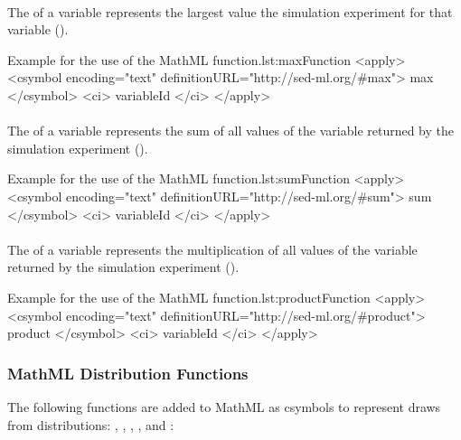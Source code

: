 \paragraph*{}
\label{fun:max}
The  of a variable represents the largest value the simulation experiment for that variable ().
\begin{myXmlLst}{Example for the use of the MathML  function.}{lst:maxFunction}
<apply>
 	<csymbol encoding="text" definitionURL="http://sed-ml.org/#max">
 		max
 	</csymbol>
 	<ci> variableId </ci>
</apply>
\end{myXmlLst}

\paragraph*{}
\label{fun:sum}
The  of a variable represents the sum of all values of the variable returned by the simulation experiment ().
\begin{myXmlLst}{Example for the use of the MathML  function.}{lst:sumFunction}
<apply>
 	<csymbol encoding="text" definitionURL="http://sed-ml.org/#sum">
 		sum
 	</csymbol>
 	<ci> variableId </ci>
</apply>
\end{myXmlLst}

\paragraph*{}
\label{fun:product}
The  of a variable represents the multiplication of all values of the variable returned by the simulation experiment ().
\begin{myXmlLst}{Example for the use of the MathML  function.}{lst:productFunction}
<apply>
 	<csymbol encoding="text" definitionURL="http://sed-ml.org/#product">
 		product
 	</csymbol>
 	<ci> variableId </ci>
</apply>
\end{myXmlLst}


\subsubsection{MathML Distribution Functions}
The following functions are added to MathML as csymbols to represent draws from distributions:  \uniform, \normal, \lognormal, \poisson, and \sedgamma:

